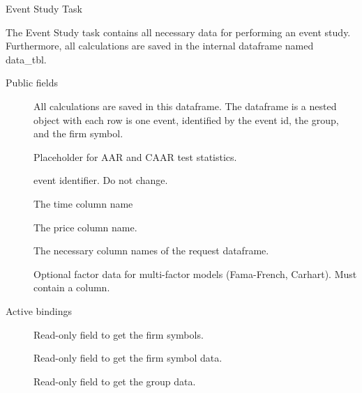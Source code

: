 \documentclass[a4paper]{book}
\begin{document}
%
\begin{Description}
Event Study Task

The Event Study task contains all necessary data for performing an event
study. Furthermore, all calculations are saved in the internal dataframe
named data\_tbl.
\end{Description}
%
\begin{Section}{Public fields}

\begin{description}

\item[] All calculations are saved in
this dataframe. The dataframe is a nested
object with each row is one event, identified
by the event id, the group, and the firm
symbol.

\item[] Placeholder for AAR and
CAAR test statistics.

\item[] event identifier. Do not change.

\item[] The time column name

\item[] The price column name.

\item[] The necessary
column names of the request dataframe.

\item[] Optional factor data for multi-factor models
(Fama-French, Carhart). Must contain a  column.

\end{description}


\end{Section}
%
\begin{Section}{Active bindings}

\begin{description}

\item[] Read-only field to get the firm symbols.

\item[] Read-only field to get the firm symbol data.

\item[] Read-only field to get the group data.

\end{description}


\end{Section}
\end{document}
